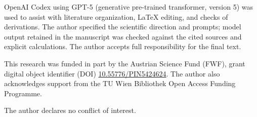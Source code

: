 \documentclass[
  aps,
  reprint,
  superscriptaddress,
  floatfix,
  nofootinbib,
  longbibliography
]{revtex4-2}
\begin{document}
\begin{acknowledgments}
OpenAI Codex using GPT-5 (generative pre-trained transformer, version 5) was
used to assist with literature organization, \LaTeX{}
editing, and checks of derivations.  The author specified the scientific
direction and prompts; model output retained in the manuscript was checked
against the cited sources and explicit calculations.  The author accepts full
responsibility for the final text.

This research was funded in part by the Austrian Science Fund (FWF), grant
digital object identifier (DOI)
\href{https://doi.org/10.55776/PIN5424624}{10.55776/PIN5424624}.
The author also acknowledges support from the TU Wien Bibliothek Open Access
Funding Programme.

The author declares no conflict of interest.
\end{acknowledgments}




\end{document}
